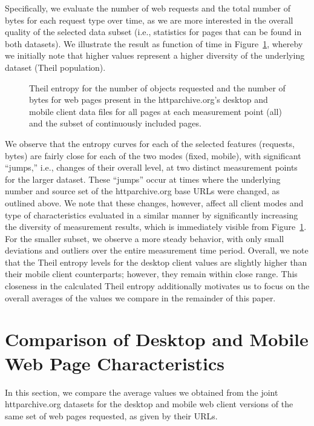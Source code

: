 Specifically, we evaluate the number of web requests and the total number of bytes for each request type over time, as we are more interested in the overall quality of the selected data subset (i.e., statistics for pages that can be found in both datasets).
We illustrate the result as function of time in Figure~\ref{fig:theil}, whereby we initially note that higher values represent a higher diversity of the underlying dataset (Theil population).


\begin{figure}[t]
	\centering
	\qquad
	\caption{Theil entropy for the number of objects requested and the number of bytes for web pages present in the httparchive.org's desktop and mobile client data files for all pages at each measurement point (all) and the subset of continuously included pages.}
	\label{fig:theil}
\end{figure}

We observe that the entropy curves for each of the selected features (requests, bytes) are fairly close for each of the two modes (fixed, mobile), with significant ``jumps,'' i.e., changes of their overall level, at two distinct measurement points for the larger dataset.
These ``jumps'' occur at times where the underlying number and source set of the httparchive.org base URLs were changed, as outlined above.
We note that these changes, however, affect all client modes and type of characteristics evaluated in a similar manner by significantly increasing the diversity of measurement results, which is immediately visible from Figure~\ref{fig:theil}.
For the smaller subset, we observe a more steady behavior, with only small deviations and outliers over the entire measurement time period.
Overall, we note that the Theil entropy levels for the desktop client values are slightly higher than their mobile client counterparts; however, they remain within close range.
This closeness in the calculated Theil entropy additionally motivates us to focus on the overall averages of the values we compare in the remainder of this paper.


\section*{Comparison of Desktop and Mobile Web Page Characteristics}
\label{s:compare}
In this section, we compare the average values we obtained from the joint httparchive.org datasets for the desktop and mobile web client versions of the same set of web pages requested, as given by their URLs.

